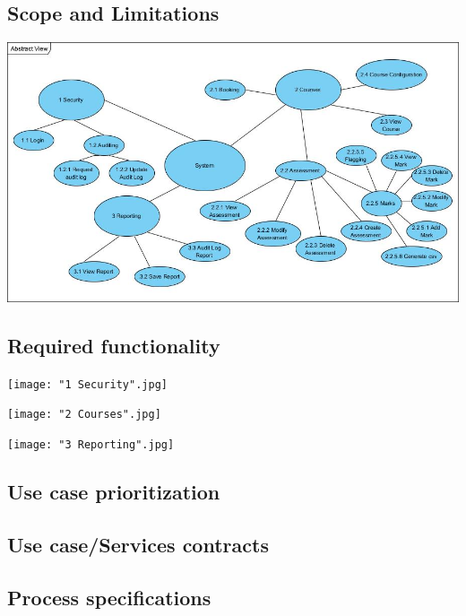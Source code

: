 \documentclass[10pt,a4paper]{article}
\begin{document}
\subsection{Scope and Limitations}

\begin{center}
\includegraphics[scale=0.5]{AbstractView.jpg}
\end{center}


\subsection{Required functionality}


\texttt{[image: "1 Security".jpg]}

\texttt{[image: "2 Courses".jpg]}

\texttt{[image: "3 Reporting".jpg]}

\subsection{Use case prioritization}
\subsection{Use case/Services contracts}
\pagebreak
\subsection{Process specifications}
\end{document}
